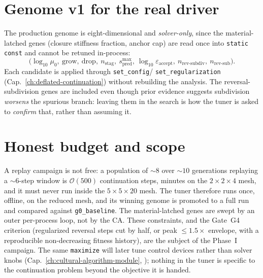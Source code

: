 \section{Genome v1 for the real driver}

The production genome is eight-dimensional and \emph{solver-only}, since
the material-latched genes (closure stiffness fraction, anchor cap) are
read once into \texttt{static const} and cannot be retuned in-process:
\[
  \bigl(\log_{10}\mu_0,\ \text{grow},\ \text{drop},\ n_{\text{stag}},\
   s_{\text{pred}}^{\max},\ \log_{10}\varepsilon_{\text{accept}},\
   n_{\text{rev-subdiv}},\ n_{\text{rev-sub}}\bigr).
\]
Each candidate is applied through \texttt{set\_config}/%
\texttt{set\_regularization} (Cap.~\ref{ch:deflated-continuation}) without
rebuilding the analysis. The reversal-subdivision genes are included even
though prior evidence suggests subdivision \emph{worsens} the spurious
branch: leaving them in the search is how the tuner is asked to
\emph{confirm} that, rather than assuming it.

\section{Honest budget and scope}

A replay campaign is not free: a population of \(\sim\!8\) over
\(\sim\!10\) generations replaying a \(\sim\!6\)-step window is
\(\mathcal{O}(500)\) continuation steps, minutes on the
\(2\times2\times4\) mesh, and it must never run inside the
\(5\times5\times20\) mesh. The tuner therefore runs once, offline, on the
reduced mesh, and its winning genome is promoted to a full run and
compared against \texttt{g0\_baseline}. The material-latched genes are
swept by an outer per-process loop, not by the CA. These constraints, and
the Gate~G4 criterion (regularized reversal steps cut by half, or peak
\(\le1.5\times\) envelope, with a reproducible non-decreasing fitness
history), are the subject of the Phase~I campaign. The same
\texttt{maximize} will later tune control devices rather than solver knobs
(Cap.~\ref{ch:cultural-algorithm-module},
\cite{LaraValenciaEchavarriaValencia2024}); nothing in the tuner is
specific to the continuation problem beyond the objective it is handed.

